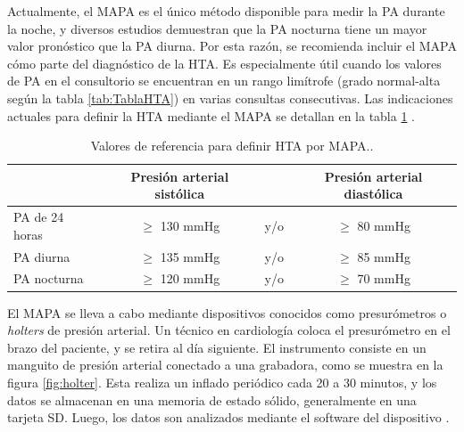Actualmente, el MAPA es el único método disponible para medir la PA durante la noche, y diversos estudios 
demuestran que la PA nocturna tiene un mayor valor pronóstico que la PA diurna. Por esta razón, se recomienda 
incluir el MAPA cómo parte del diagnóstico de la HTA. Es especialmente útil cuando los valores de PA en el 
consultorio se encuentran en un rango limítrofe (grado normal-alta según la tabla \ref{tab:TablaHTA}) en 
varias consultas consecutivas. Las indicaciones actuales para definir la HTA mediante el MAPA se detallan 
en la tabla \ref{tab:HTA-MAPA} \citep{CITE:7}.

\begin{table}[h]
	\centering
	\caption[Valores de referencia para definir HTA por MAPA]{Valores de referencia para definir HTA por MAPA.\protect\footnotemark.}
	\begin{tabular}{l c c c}    
		\toprule
		\textbf{} 	      & \textbf{Presión arterial sistólica} 	& \textbf{}	& \textbf{Presión arterial diastólica}  \\
		\midrule
    PA de 24 horas     &  $\geq$ 130 mmHg                     & 	y/o			&  $\geq$ 80 mmHg \\	
    PA diurna          &  $\geq$ 135 mmHg                     & 	y/o			&  $\geq$ 85 mmHg \\	
    PA nocturna        &  $\geq$ 120 mmHg                     & 	y/o			&  $\geq$ 70 mmHg \\	
		\bottomrule
		\hline
	\end{tabular}
	\label{tab:HTA-MAPA}
\end{table}


El MAPA se lleva a cabo mediante dispositivos conocidos como presurómetros o \textit{holters} de presión arterial. 
Un técnico en cardiología coloca el presurómetro en el brazo del paciente, y se retira al día siguiente. 
El instrumento consiste en un manguito de presión arterial conectado a una grabadora, como se muestra en 
la figura \ref{fig:holter}. Esta realiza un inflado periódico cada 20 a 30 minutos, y los datos se almacenan en una memoria 
de estado sólido, generalmente en una tarjeta SD. Luego, los datos son analizados mediante el software del 
dispositivo \citep{CITE:3} \citep{CITE:7}.

